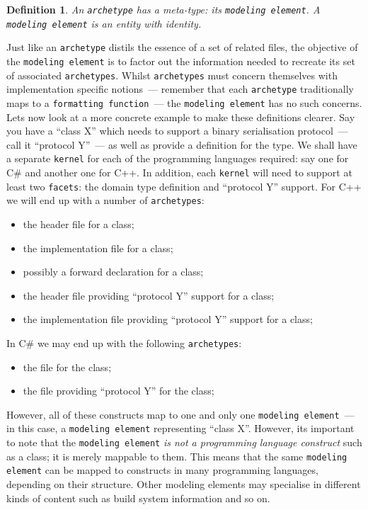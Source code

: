 \documentclass{book}
\newtheorem{concept}{Definition}
\begin{document}
\begin{concept}
An \texttt{archetype} has a meta-type: its \texttt{modeling
  element}. A \texttt{modeling element} is an entity with
identity.
\end{concept}

Just like an \texttt{archetype} distils the essence of a set of
related files, the objective of the \texttt{modeling element} is to
factor out the information needed to recreate its set of associated
\texttt{archetypes}. Whilst \texttt{archetypes} must concern
themselves with implementation specific notions~--- remember that each
\texttt{archetype} traditionally maps to a \texttt{formatting
  function}~--- the \texttt{modeling element} has no such
concerns. Lets now look at a more concrete example to make these
definitions clearer. Say you have a ``class X'' which needs to support
a binary serialisation protocol~--- call it ``protocol Y''~--- as well
as provide a definition for the type. We shall have a separate
\texttt{kernel} for each of the programming languages required: say
one for C\# and another one for C++. In addition, each \texttt{kernel}
will need to support at least two \texttt{facets}: the domain type
definition and ``protocol Y'' support. For C++ we will end up with a
number of \texttt{archetypes}:

\begin{itemize}
\item the header file for a class;
\item the implementation file for a class;
\item possibly a forward declaration for a class;
\item the header file providing ``protocol Y'' support for a class;
\item the implementation file providing ``protocol Y'' support for a class;
\end{itemize}

In C\# we may end up with the following \texttt{archetypes}:

\begin{itemize}
\item the file for the class;
\item the file providing ``protocol Y'' for the class;
\end{itemize}

However, all of these constructs map to one and only one
\texttt{modeling element}~--- in this case, a \texttt{modeling
  element} representing ``class X''. However, its important to note
that the \texttt{modeling element} \emph{is not a programming language
  construct} such as a class; it is merely mappable to them. This
means that the same \texttt{modeling element} can be mapped to
constructs in many programming languages, depending on their
structure. Other modeling elements may specialise in different kinds
of content such as build system information and so on.
\end{document}
